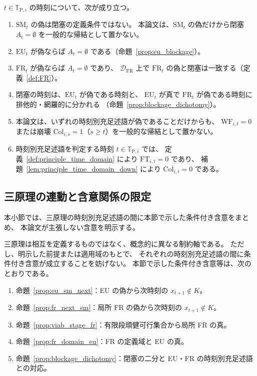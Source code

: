 \begin{remark}
\label{rem:principles_failure_table}
$t\in\mathbb{T}_{\mathrm{P},i}$ の時刻について、次が成り立つ。
\begin{enumerate}
  \item $\mathrm{SM}_t$ の偽は閉塞の定義条件ではない。
  本論文は、$\mathrm{SM}_t$ の偽だけから閉塞 $A_t=\emptyset$ を一般的な帰結として置かない。
  \item $\mathrm{EU}_t$ が偽ならば $A_t=\emptyset$ である（命題~\ref{prop:eu_blockage}）。
  \item $\mathrm{FR}_t$ が偽ならば $A_t=\emptyset$ であり、
  $\mathcal{D}_{\mathrm{FR}}$ 上で $\mathrm{FR}_t$ の偽と閉塞は一致する（定義~\ref{def:FR}）。
  \item 閉塞の時刻は、$\mathrm{EU}_t$ が偽である時刻と、
  $\mathrm{EU}_t$ が真で $\mathrm{FR}_t$ が偽である時刻に排他的・網羅的に分かれる
  （命題~\ref{prop:blockage_dichotomy}）。
  \item 本論文は、いずれの時刻別充足述語が偽であることだけからも、
  $\mathrm{WF}_{i,t}=0$ または崩壊 $\mathrm{Col}_{i,s}=1$（$s\ge t$）を一般的な帰結として置かない。
  \item 時刻別充足述語を判定する時刻 $t\in\mathbb{T}_{\mathrm{P},i}$ では、
  定義~\ref{def:principle_time_domain} により $\mathrm{FT}_{i,t}=0$ であり、
  補題~\ref{lem:principle_time_domain_down} により $\mathrm{Col}_{i,t}=0$ である。
\end{enumerate}
\end{remark}

\subsection{三原理の連動と含意関係の限定}
\label{subsec:principle_linkage}

本小節では、三原理の時刻別充足述語の間に本節で示した条件付き含意をまとめ、
本論文が主張しない含意を明示する。

\begin{remark}[三原理の連動]
\label{rem:principle_linkage}
三原理は相互を定義するものではなく、概念的に異なる制約軸である。
ただし、明示した前提または適用域のもとで、
それぞれの時刻別充足述語の間に条件付き含意が成立することを妨げない。
本節で示した条件付き含意等は、次のとおりである。
\begin{enumerate}
  \item 命題~\ref{prop:eu_sm_next}：EU の偽から次時刻の $x_{t+1}\notin K$。
  \item 命題~\ref{prop:fr_next_sm}：局所 FR の偽から次時刻の $x_{t+1}\notin K$。
  \item 命題~\ref{prop:viab_stage_fr}：有限段頑健可行集合から局所 FR の真。
  \item 命題~\ref{prop:fr_domain_eu}：FR の定義域と EU の真。
  \item 命題~\ref{prop:blockage_dichotomy}：閉塞の二分と EU・FR の時刻別充足述語との対応。
\end{enumerate}
\end{remark}


